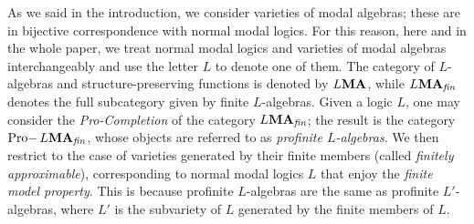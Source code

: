 \documentclass{article}
\theoremstyle{definition}
\DeclareMathOperator{\Pro}{Pro-}
\newcommand{\MA}{\textup{\textbf{MA}}}
\newcommand{\fin}{\textit{fin}}
\begin{document}

As we said in the introduction, we consider varieties of modal algebras; these are in bijective correspondence with normal modal logics. For this reason, here and in the whole paper, we treat normal modal logics and varieties of modal algebras interchangeably and use the letter $L$ to denote one of them. The category of $L$-algebras and structure-preserving functions is denoted by $L\MA$, while $L\MA_\fin$ denotes the full subcategory given by finite $L$-algebras.
Given a logic $L$, one may consider the \emph{Pro-Completion} of the category $L\MA_\fin$; the result is the category $\Pro L\MA_\fin$, whose objects are referred to as \emph{profinite $L$-algebras}. We then restrict to the case of varieties generated by their finite members (called \emph{finitely approximable}), corresponding to normal modal logics $L$ that enjoy the \emph{finite model property}. This is because profinite $L$-algebras are the same as profinite $L'$-algebras, where $L'$ is the subvariety of $L$ generated by the finite members of $L$.
\end{document}
